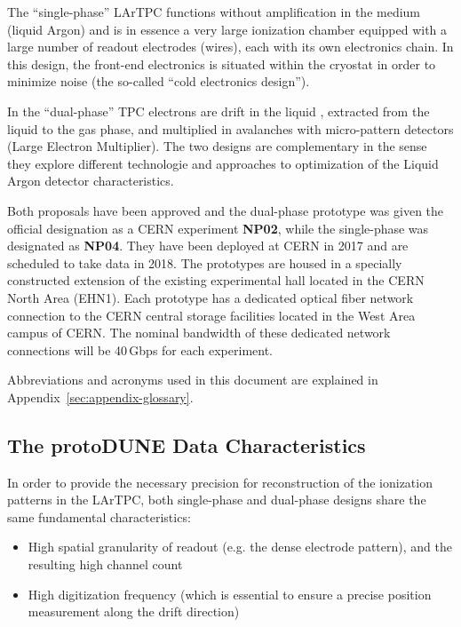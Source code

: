 \documentclass[12pt]{article}
\begin{document}
The ``single-phase''  LArTPC functions without amplification in the medium (liquid Argon) and is in essence a very large ionization chamber
equipped with a large number of readout electrodes (wires), each with its own electronics chain. In this design, the front-end electronics is
situated within the cryostat in order to minimize noise (the so-called ``cold electronics design'').

In the ``dual-phase''  TPC electrons are drift in the liquid ,  extracted from the liquid to the gas phase, and multiplied in avalanches with micro-pattern detectors (Large Electron Multiplier). 
The two designs are complementary
in the sense they explore different technologie and approaches to optimization of the Liquid Argon detector characteristics.

Both  proposals have been approved and the dual-phase prototype was given the official designation as a CERN experiment \textbf{NP02},
while the single-phase was designated as \textbf{NP04}. They have been deployed at CERN in 2017 and are scheduled to take data in 2018.
The prototypes are housed in a specially constructed extension of the existing experimental hall located in the CERN North Area (EHN1).
Each prototype has a dedicated optical fiber network connection to the CERN central storage facilities located in the West Area
campus of CERN. The nominal bandwidth of these dedicated network connections will be 40\,Gbps for each experiment.

Abbreviations and acronyms used in this document are explained in Appendix~\ref{sec:appendix-glossary}.


\subsection{The protoDUNE Data Characteristics}

In order to provide the necessary precision for reconstruction of the ionization patterns in the LArTPC, both single-phase and dual-phase designs share the same fundamental characteristics:
\begin{itemize}
\item High spatial granularity of readout (e.g. the dense electrode pattern), and the resulting high channel count
\item High digitization frequency (which is essential to ensure a precise position measurement along the drift direction)
\end{itemize}
\end{document}
